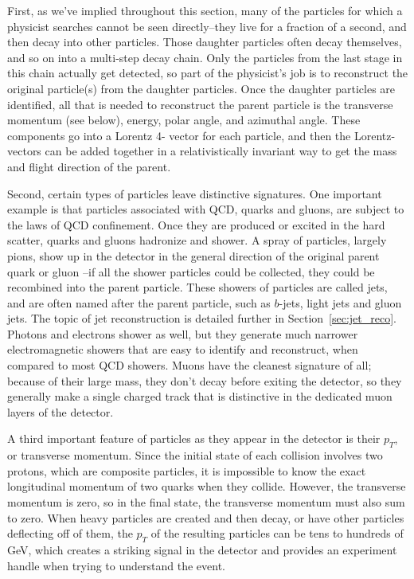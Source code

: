 First, as we've implied throughout this section, many of the particles 
for which a physicist searches cannot be seen directly--they live for a fraction 
of a second, and then decay into other particles.  Those daughter particles often 
decay themselves, and so on into a  multi-step decay chain.  Only 
the particles from the last stage in this chain actually get detected, so part 
of the physicist's job is to reconstruct the original particle(s) 
from the daughter particles.  Once the daughter particles are identified, all that is 
needed to reconstruct the parent particle is the transverse momentum (see below), energy, 
polar angle, and azimuthal angle.  These components go into a Lorentz 4-
vector for each particle, and then the Lorentz-vectors can be added together 
in a relativistically invariant way to get the mass and flight direction of the parent.

Second, certain types of particles leave distinctive signatures.  One important example is that 
particles associated with QCD, quarks and gluons, are subject to the laws of 
QCD confinement.  Once they are produced or excited in the hard scatter, quarks 
and gluons hadronize and shower.  A spray of particles, largely pions, show 
up in the detector in the general direction of the original parent quark or gluon
--if all the shower particles could be collected, they could be recombined into 
the parent particle.  These showers of particles are called jets, and are often 
named after the parent particle, such as $b$-jets, light jets 
and gluon jets.  The topic of jet reconstruction is detailed further in Section~\ref{sec:jet_reco}.  
Photons and electrons shower as well, but they generate much narrower electromagnetic showers that 
are easy to identify and reconstruct, when compared to most QCD showers.  Muons 
have the cleanest signature of all; because of their large mass, they don't 
decay before exiting the detector, so they generally make a single charged track that 
is distinctive in the dedicated muon layers of the detector.

A third important feature of particles as they appear in the detector is their $p_T$, 
or transverse momentum.  Since the initial state of each collision involves two protons, 
which are composite particles, it is impossible to know the exact longitudinal momentum of 
two quarks when they collide.  However, the transverse momentum is zero, so 
in the final state, the transverse momentum must also sum to zero.  When 
heavy particles are created and then decay, or have other particles deflecting off of 
them, the $p_T$ of the resulting particles can be tens 
to hundreds of GeV, which creates a striking signal in the detector and provides 
an experiment handle when trying to understand the event.

